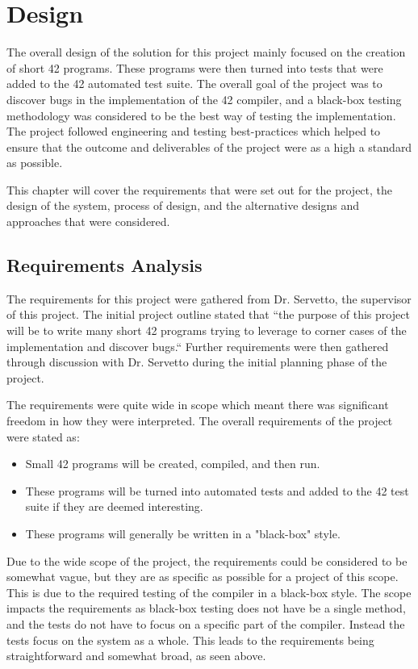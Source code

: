 \chapter{Design}\label{design}

The overall design of the solution for this project mainly focused on the creation of  short 42 programs. These programs were then turned into tests that were added to the 42 automated test suite. The overall goal of the project was to discover bugs in the implementation of the 42 compiler, and a black-box testing methodology was considered to be the best way of testing the implementation. The project followed engineering and testing best-practices which helped to ensure that the outcome and deliverables of the project were as a high a standard as possible.

This chapter will cover the requirements that were set out for the project, the design of the system, process of design, and the alternative designs and approaches that were considered.

\section{Requirements Analysis \label{reqs}}

The requirements for this project were gathered from Dr. Servetto, the supervisor of this project. The initial project outline stated that ``the purpose of this project will be to write many short 42 programs trying to leverage to corner cases of the implementation and discover bugs.`` Further requirements were then gathered through discussion with Dr. Servetto during the initial planning phase of the project.

The requirements were quite wide in scope which meant there was significant freedom in how they were interpreted. The overall requirements of the project were stated as:

\begin{itemize}
	\item{Small 42 programs will be created, compiled, and then run.}
	\item{These programs will be turned into automated tests and added to the 42 test suite if they are deemed interesting.}
	\item{These programs will generally be written in a "black-box" style.}
\end{itemize}

Due to the wide scope of the project, the requirements could be considered to be somewhat vague, but they are as specific as possible for a project of this scope. This is due to the required testing of the compiler in a black-box style. The scope impacts the requirements as black-box testing does not have be a single method, and the tests do not have to focus on a specific part of the compiler. Instead the tests focus on the system as a whole. This leads to the requirements being straightforward and somewhat broad, as seen above.

